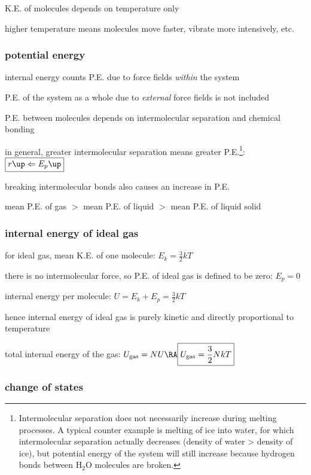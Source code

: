 K.E. of molecules depends on temperature only

higher temperature means molecules move faster, vibrate more intensively, etc.





\subsubsection{potential energy}

\cmt internal energy counts P.E. due to force fields \emph{within} the system

P.E. of the system as a whole due to \emph{external} force fields is not included

\cmt P.E. between molecules depends on intermolecular separation and chemical bonding

in general, greater intermolecular separation means greater P.E.\footnote{Intermolecular separation does not necessarily increase during melting processes. A typical counter example is melting of ice into water, for which intermolecular separation actually decreases (density of water > density of ice), but potential energy of the system will still increase because hydrogen bonds between H$_2$O molecules are broken.}: $\boxed{r \up \Leftarrow E_p \up}$

breaking intermolecular bonds also causes an increase in P.E.

mean P.E. of gas $>$ mean P.E. of liquid $>$ mean P.E. of liquid solid

\subsubsection{internal energy of ideal gas}

for ideal gas, mean K.E. of one molecule: $E_k = \frac{3}{2}kT$

there is no intermolecular force, so P.E. of ideal gas is defined to be zero: $E_p = 0$

internal energy per molecule: $U = E_k + E_p = \frac{3}{2}kT$

hence internal energy of ideal gas is purely kinetic and directly proportional to temperature

total internal energy of the gas: $U_\text{gas} = NU \RA \boxed{U_\text{gas} = \frac{3}{2}NkT}$

\subsubsection{change of states}

